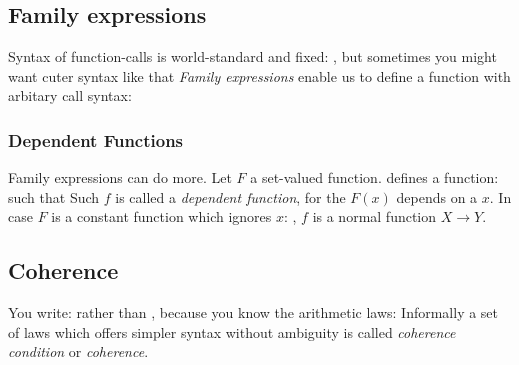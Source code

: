 \subsection{Family expressions}

Syntax of function-calls is world-standard and fixed:
, but sometimes you might want cuter syntax like that
\textit{Family expressions} enable us to define a function with arbitary call syntax:

\subsubsection{Dependent Functions}

Family expressions can do more. Let $F$ a set-valued function.
defines a function:
such that
Such $f$ is called a \textit{dependent function}, for the $F(x)$ depends on a $x$. 
In case $F$ is a constant function which ignores $x$:
, $f$ is a normal function $X \to Y$. 


\subsection{Coherence}

You write:
rather than
, because you know the arithmetic laws:
Informally a set of laws which offers simpler syntax without ambiguity is called \textit{coherence condition} or \textit{coherence}.


